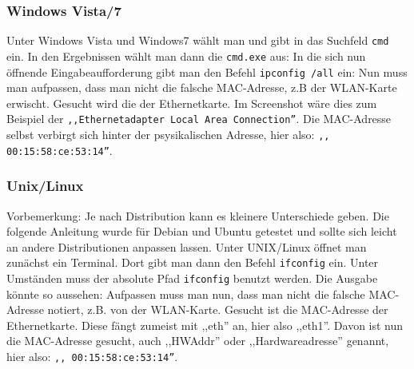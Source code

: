\subsubsection*{Windows Vista/7}
Unter Windows Vista und Windows7 wählt man  und gibt in das Suchfeld 
 \texttt{cmd} ein. In den Ergebnissen wählt man dann die \texttt{cmd.exe} aus:
 In die sich
nun öffnende Eingabeaufforderung gibt man den Befehl \texttt{ipconfig /all}
ein: %
Nun muss man aufpassen, dass man nicht die falsche MAC-Adresse, z.B
der WLAN-Karte erwischt. Gesucht wird die der Ethernetkarte. Im
Screenshot wäre dies zum Beispiel der \texttt{,,Ethernetadapter Local Area Connection''}. 
Die MAC-Adresse selbst verbirgt sich hinter der psysikalischen
Adresse, hier %
also: \texttt{,, 00:15:58:ce:53:14''}. 
\newpage
\subsubsection*{Unix/Linux}
\small{Vorbemerkung: Je nach Distribution kann es kleinere Unterschiede
geben. Die folgende Anleitung wurde für Debian und Ubuntu getestet und
sollte sich leicht an andere Distributionen anpassen lassen.} Unter
\glossar UNIX/Linux öffnet man zunächst ein Terminal. Dort gibt man
dann den Befehl \texttt{ifconfig} ein. Unter Umständen muss der
absolute Pfad \texttt{ifconfig} benutzt werden. Die Ausgabe könnte so
aussehen: %
Aufpassen muss man nun, dass man nicht die falsche MAC-Adresse
notiert, z.B. von der WLAN-Karte.
Gesucht ist die MAC-Adresse der Ethernetkarte. Diese fängt zumeist mit
,,eth'' an, hier also ,,eth1''.  Davon ist nun die MAC-Adresse
gesucht, auch ,,HWAddr'' oder ,,Hardwareadresse'' genannt, hier
also: \texttt{,, 00:15:58:ce:53:14''}. 

